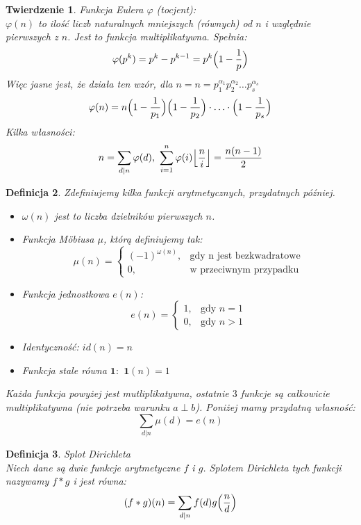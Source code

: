 \documentclass[10pt,a4paper]{article}
\newtheorem{theorem}{Twierdzenie}[section]
\newtheorem{defi}[theorem]{Definicja}
\newcommand{\q}{\textbf{1}}
\begin{document}
\begin{theorem} \color{black} Funkcja Eulera $\varphi$ (tocjent):
	\\ $\varphi(n)$ to ilość liczb naturalnych mniejszych (równych) od $n$ i względnie pierwszych z $n$. Jest to funkcja multiplikatywna. Spełnia:
	$$\varphi(p^k)=p^k-p^{k-1}=p^k\Bigl(1-\frac{1}{p}\Bigr)$$
	Więc jasne jest, że działa ten wzór, dla $n=n=p_1^{\alpha_1}p_2^{\alpha_2}\ldots p_s^{\alpha_s}$
	$$\varphi(n)=n\Bigl(1-\frac{1}{p_1}\Bigr)\Bigl(1-\frac{1}{p_2}\Bigr)\cdot \ldots \cdot \Bigl(1-\frac{1}{p_s}\Bigr)$$
	Kilka własności:
	$$n=\sum_{d|n}\varphi(d) \textrm{, } \sum_{i=1}^{n}\varphi(i)\Bigl\lfloor \frac{n}{i} \Bigr\rfloor = \frac{n(n-1)}{2}$$
\end{theorem}
\begin{defi} \color{black} Zdefiniujemy kilka funkcji arytmetycznych, przydatnych później.
\begin{itemize}
	\item $\omega(n)$ jest to liczba dzielników pierwszych $n$.
	\item Funkcja Möbiusa $\mu$, którą definiujemy tak:
	$$
	\mu(n)=
	\left\{ \begin{array}{ll}
	(-1)^{\omega(n)}, & \textrm{gdy n jest bezkwadratowe}\\
	0, & \textrm{w przeciwnym przypadku}
	\end{array} \right.	
	$$
	\item Funkcja jednostkowa $e(n)$:
	$$
	e(n)=
	\left\{ \begin{array}{ll}
	1, & \textrm{gdy } n=1\\
	0, & \textrm{gdy } n>1
	\end{array} \right.	
	$$
	\item Identyczność: $id(n)=n$
	\item Funkcja stale równa $\q:$ $\q (n)=1$
\end{itemize}
Każda funkcja powyżej jest mutliplikatywna, ostatnie $3$ funkcje są całkowicie multiplikatywna (nie potrzeba warunku $a\perp b$). Poniżej mamy przydatną własność:
$$\sum_{d|n} \mu(d)=e(n)$$
\end{defi}
\begin{defi}{Splot Dirichleta}
	\\ \color{black}
	Niech dane są dwie funkcje arytmetyczne $f$ i $g$. Splotem Dirichleta tych funkcji nazywamy $f*g$ i jest równa:
	$$(f *g)(n)=\sum_{d|n}f(d)g\Bigl(\frac{n}{d}\Bigr)$$
\end{defi}
\end{document}

